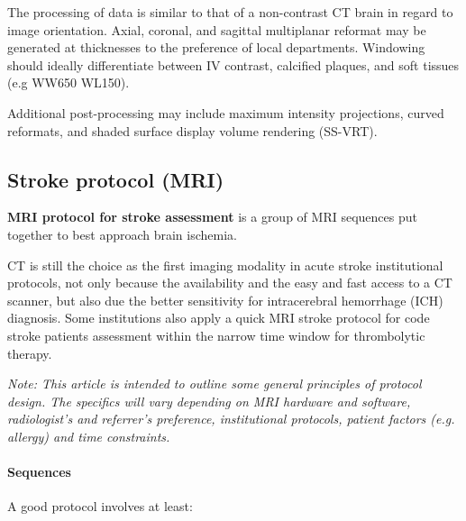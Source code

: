 The processing of data is similar to that of a non-contrast CT brain in regard to image orientation. Axial, coronal, and sagittal multiplanar reformat may be generated at thicknesses to the preference of local departments. Windowing should ideally differentiate between IV contrast, calcified plaques, and soft tissues (e.g WW650 WL150).

Additional post-processing may include maximum intensity projections, curved reformats, and shaded surface display volume rendering (SS-VRT).

\subsection{Stroke protocol (MRI)}

\textbf{MRI protocol for stroke assessment} is a group of MRI sequences put together to best approach brain ischemia.

CT is still the choice as the first imaging modality in acute stroke institutional protocols, not only because the availability and the easy and fast access to a CT scanner, but also due the better sensitivity for intracerebral hemorrhage (ICH) diagnosis. Some institutions also apply a quick MRI stroke protocol for code stroke patients assessment within the narrow time window for thrombolytic therapy.

\emph{Note: This article is intended to outline some general principles of protocol design. The specifics will vary depending on MRI hardware and software, radiologist's and referrer's preference, institutional protocols, patient factors (e.g. allergy) and time constraints.}

\paragraph{Sequences}

A good protocol involves at least:

